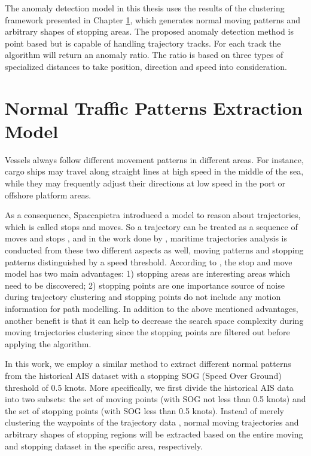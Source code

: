 \documentclass[12pt,glossary]{dalcsthesis}
\begin{document}
The anomaly detection model in this thesis uses the results of the clustering framework presented in Chapter \ref{ch:normal_traffic_extraction_model}, which generates normal moving patterns and arbitrary shapes of stopping areas.
The proposed anomaly detection method is point based but is capable of handling trajectory tracks. For each track the algorithm will return an anomaly ratio. The ratio is based on three types of specialized distances to take position, direction and speed into consideration.




\chapter{Normal Traffic Patterns Extraction Model}
\label{ch:normal_traffic_extraction_model}

Vessels always follow different movement patterns in different areas. For instance, cargo ships may travel along straight lines at high speed in the middle of the sea, while they may frequently adjust their directions at low speed in the port or offshore platform areas. 

As a consequence, Spaccapietra \cite{stopmove} introduced a model to reason about trajectories, which is called stops and moves. So a trajectory can be treated as a sequence of moves and stops \cite{stopmove}, and in the work done by \cite{vespe12}\cite{PallottaFramework}\cite{Nicolas}, maritime trajectories analysis is conducted from these two different aspects as well, moving patterns and stopping patterns distinguished by a speed threshold. According to \cite{Nicolas}, the stop and move model has two main advantages: 1) stopping areas are interesting areas which need to be discovered; 2) stopping points are one importance source of noise during trajectory clustering and stopping points do not include any motion information for path modelling. In addition to the above mentioned advantages, another benefit is that it can help to decrease the search space complexity during moving trajectories clustering since the stopping points are filtered out before applying the algorithm. %

In this work, we employ a similar method to extract different normal patterns from the historical AIS dataset with a stopping SOG (Speed Over Ground) threshold of 0.5 knots. More specifically, we first divide the historical AIS data into two subsets: the set of moving points (with SOG not less than 0.5 knots) and the set of stopping points (with SOG less than 0.5 knots). Instead of merely clustering the waypoints of the trajectory data \cite{vespe12}\cite{PallottaFramework}, normal moving trajectories and arbitrary shapes of stopping regions will be extracted based on the entire moving and stopping dataset in the specific area, respectively.
\end{document}
